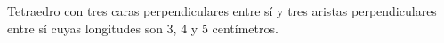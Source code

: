 \item Tetraedro con tres caras perpendiculares entre sí y tres aristas perpendiculares entre sí cuyas longitudes son 3, 4 y 5 centímetros.
